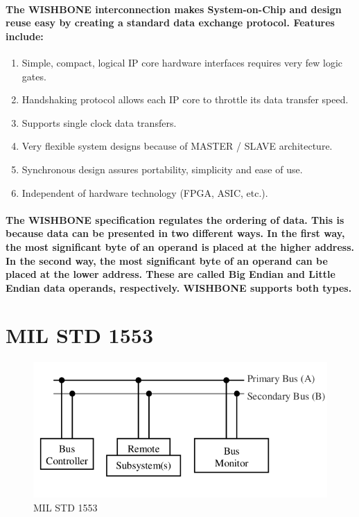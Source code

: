 \documentclass[12pt,a4paper]{report}
\begin{document}
\paragraph{\textrm{\textmd{The WISHBONE interconnection makes System-on-Chip and design reuse easy by creating a
			standard data exchange protocol. Features include: }}}
\begin{enumerate}[font=$\bullet$\scshape\bfseries]
	\item []Simple, compact, logical IP core hardware interfaces requires very few logic gates. 
	\item []Handshaking protocol allows each IP core to throttle its data transfer speed.
	\item []Supports single clock data transfers. 
	\item []Very flexible system designs because of MASTER / SLAVE architecture.
	\item []Synchronous design assures portability, simplicity and ease of use. 
	\item []Independent of hardware technology (FPGA, ASIC, etc.). 
\end{enumerate}
\paragraph{\textrm{\textmd {The WISHBONE specification regulates the ordering of data. This is because data can be presented in two different ways. In the first way, the most significant byte of an operand is placed
			at the higher address. In the second way, the most significant byte of an operand can be
			placed at the lower address. These are called Big Endian and Little Endian
			data operands, respectively. WISHBONE supports both types.  }}}
\section{MIL STD 1553}
\begin{figure}[h]
	\centering
	\includegraphics[scale=.4]{1553.png}
	\caption{MIL STD 1553}
	\label{fig:1553}
\end{figure}
\end{document}
